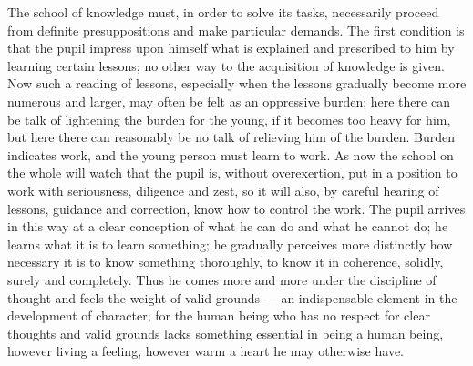 \documentclass[12pt,a4paper,openany]{book}
\newcommand{\opage}[1]{\marginnote{\footnotesize\textit{[#1]}}}
\begin{document}
The school of knowledge must, in order to solve its tasks,
necessarily proceed from definite presuppositions and
make particular demands. The first condition is that
the pupil impress upon himself what is explained and prescribed to
him by learning certain lessons; no other way to the
acquisition of knowledge is given. Now such
a reading of lessons, especially when the lessons gradually
become more numerous and larger, may often be felt as an oppressive
burden; here there can be talk of lightening the
burden for the young, if it becomes too heavy for him, but here
there can reasonably be no talk of relieving him of
the burden. Burden indicates work, and the young person must
\setcounter{footnote}{0}%
\opage{300}learn to work. As now the school on the whole will watch
that the pupil is, without overexertion, put in a position
to work with seriousness, diligence and zest, so it will
also, by careful hearing of lessons, guidance and correction,
know how to control the work. The pupil arrives
in this way at a clear conception of what he
can do and what he cannot do; he learns what it is to
learn something; he gradually perceives more distinctly how
necessary it is to know something thoroughly,
to know it in coherence, solidly, surely and completely.
Thus he comes more and more under the discipline of thought
and feels the weight of valid grounds --- an indispensable
element in the development of character; for the human being who
has no respect for clear thoughts and valid grounds
lacks something essential in being a human being, however living
a feeling, however warm a heart he may otherwise have.
\end{document}
